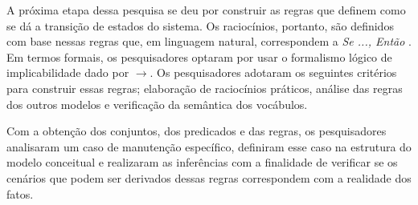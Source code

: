 A próxima etapa dessa pesquisa se deu por construir as regras que definem como se dá a transição de estados do sistema. Os raciocínios, portanto, são definidos com base nessas regras que, em linguagem natural, correspondem a \textit{Se ..., Então }. Em termos formais, os pesquisadores optaram por usar o formalismo lógico de implicabilidade dado por $\to$. Os pesquisadores adotaram os seguintes critérios para construir essas regras; elaboração de raciocínios práticos, análise das regras dos outros modelos e verificação da semântica dos vocábulos.   

Com a obtenção dos conjuntos, dos predicados e das regras, os pesquisadores analisaram um caso de manutenção específico, definiram esse caso na estrutura do modelo conceitual e realizaram as inferências com a finalidade de verificar se os cenários que podem ser derivados dessas regras correspondem com a realidade dos fatos. 
